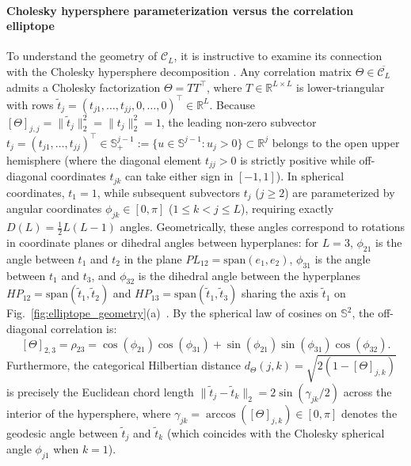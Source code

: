 \documentclass[default,sn-mathphys,Numbered]{sn-jnl}
\theoremstyle{thmstyleone}
\theoremstyle{thmstylethree}
\theoremstyle{thmstyletwo}
\begin{document}
\paragraph{Cholesky hypersphere parameterization versus the correlation elliptope}
To understand the geometry of $\mathcal{C}_L$, it is instructive to examine its connection with the Cholesky hypersphere decomposition \citep{pinheiro_unconstrained_1996,Zhou,HS_Jacobi,li2022permutation}. Any correlation matrix $\Theta \in \overline{\mathcal{C}_L}$ admits a Cholesky factorization $\Theta = T T^\top$, where $T \in \mathbb{R}^{L \times L}$ is lower-triangular with rows $\widetilde{t}_j = (t_{j1}, \ldots, t_{jj}, 0, \ldots, 0)^\top \in \mathbb{R}^L$. Because $[\Theta]_{j, j} = \|\widetilde{t}_j\|_2^2 = \|t_j\|_2^2 = 1$, the leading non-zero subvector $t_j = (t_{j1}, \ldots, t_{jj})^\top \in \mathbb{S}^{j-1}_+ := \{ u \in \mathbb{S}^{j-1} : u_j > 0 \} \subset \mathbb{R}^j$ belongs to the open upper hemisphere (where the diagonal element $t_{jj} > 0$ is strictly positive while off-diagonal coordinates $t_{jk}$ can take either sign in $[-1, 1]$). In spherical coordinates, $t_1 = 1$, while subsequent subvectors $t_j$ ($j \ge 2$) are parameterized by angular coordinates $\phi_{jk} \in [0, \pi]$ ($1 \le k < j \le L$), requiring exactly $D(L) = \frac{1}{2}L(L-1)$ angles. 
Geometrically, these angles correspond to rotations in coordinate planes or dihedral angles between hyperplanes: for $L=3$, $\phi_{21}$ is the angle between $t_1$ and $t_2$ in the plane $PL_{12} = \mathrm{span}(e_1, e_2)$, $\phi_{31}$ is the angle between $t_1$ and $t_3$, and $\phi_{32}$ is the dihedral angle between the hyperplanes $HP_{12} = \mathrm{span}(\widetilde{t}_1, \widetilde{t}_2)$ and $HP_{13} = \mathrm{span}(\widetilde{t}_1, \widetilde{t}_3)$ sharing the axis $\widetilde{t}_1$ on Fig.~\ref{fig:elliptope_geometry}(a)~\citep{HS_Jacobi, li2022permutation}. By the spherical law of cosines on $\mathbb{S}^2$, the off-diagonal correlation is:
\begin{equation}
\label{eq:spherical_cosine_law}
[\Theta]_{2, 3} = \rho_{23} = \cos ( \phi_{21}) \cos (\phi_{31} )+ \sin ( \phi_{21}) \sin (\phi_{31} ) \cos (\phi_{32}).
\end{equation}
Furthermore, the categorical Hilbertian distance $d_\Theta(j, k) = \sqrt{2(1 - [\Theta]_{j, k})}$ is precisely the Euclidean chord length $\|\widetilde{t}_j - \widetilde{t}_k\|_2 = 2\sin(\gamma_{jk}/2)$ across the interior of the hypersphere, where $\gamma_{jk} = \arccos([\Theta]_{j,k}) \in [0, \pi]$ denotes the geodesic angle between $\widetilde{t}_j$ and $\widetilde{t}_k$ (which coincides with the Cholesky spherical angle $\phi_{j1}$ when $k = 1$).
\end{document}
